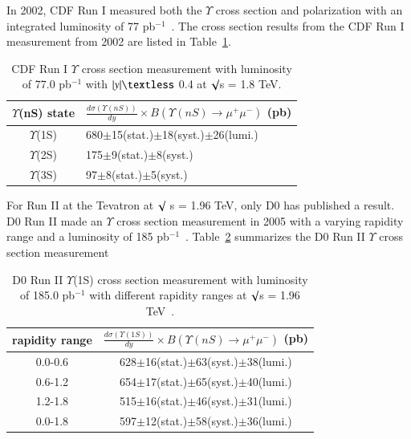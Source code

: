 In 2002, CDF Run I measured both the $\Upsilon$ cross section and polarization with
an integrated luminosity of 77 pb$^{-1}$~\cite{CDF:2001fdy}. The cross section results from the CDF
Run I measurement from 2002 are listed in Table~\ref{Tab:YCrossCDF02}.


\begin{table}
  \begin{center}
    \caption[]{CDF Run I $\Upsilon$ cross section measurement with luminosity of 77.0 pb$^{-1}$ with $|y|\textless$ 0.4 at
    $\surd$s = 1.8 TeV.}
\label{Tab:YCrossCDF02}
\begin{tabular}{cl} 
\hline 
\hline
$\Upsilon$(nS) state             &$\frac{d\sigma(\Upsilon(nS))}{dy}\times B(\Upsilon(nS)\rightarrow\mu^{+}\mu^{-})$ (pb)    \\              
\hline
$\Upsilon$(1S)                   &680$\pm$15(stat.)$\pm$18(syst.)$\pm$26(lumi.)\\
$\Upsilon$(2S)                   &175$\pm$9(stat.)$\pm$8(syst.)\\
$\Upsilon$(3S)                   &97$\pm$8(stat.)$\pm$5(syst.)\\   
\hline
\hline
\end{tabular}
\end{center}
\end{table}



For Run II at the Tevatron at $\surd$ s = 1.96 TeV, only D0 has published a result.
D0 Run II made an $\Upsilon$ cross section measurement in 2005 with a varying rapidity range and a luminosity of
185 pb$^{-1}$~\cite{D0:2005klj}. Table~\ref{Tab:YCrossD0RunII} summarizes the D0 Run II $\Upsilon$ cross section
measurement


\begin{table}
  \begin{center}
    \caption[]{D0 Run II $\Upsilon$(1S) cross section measurement with luminosity of 185.0 pb$^{-1}$
      with different rapidity ranges at $\surd$s = 1.96 TeV~\cite{D0:2005klj}.}
\label{Tab:YCrossD0RunII}
\begin{tabular}{cc} 
\hline 
\hline
rapidity range             &$\frac{d\sigma(\Upsilon(1S))}{dy}\times B(\Upsilon(nS)\rightarrow\mu^{+}\mu^{-})$ (pb)    \\              
\hline
0.0-0.6                   &628$\pm$16(stat.)$\pm$63(syst.)$\pm$38(lumi.)\\
0.6-1.2                   &654$\pm$17(stat.)$\pm$65(syst.)$\pm$40(lumi.)\\
1.2-1.8                   &515$\pm$16(stat.)$\pm$46(syst.)$\pm$31(lumi.)\\
0.0-1.8                   &597$\pm$12(stat.)$\pm$58(syst.)$\pm$36(lumi.)\\
\hline
\hline
\end{tabular}
\end{center}
\end{table}



